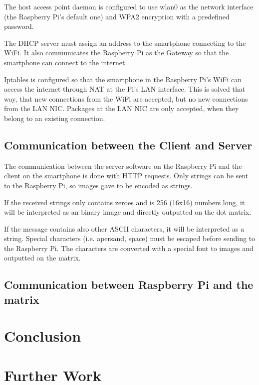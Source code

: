 \documentclass[conference]{IEEEtran}
\begin{document}
The host access point daemon is configured to use wlan0 as the network interface (the Raspberry Pi's default one) and WPA2  encryption with a predefined password.

The DHCP server must assign an address to the smartphone connecting to the WiFi. It also communicates the Raspberry Pi as the Gateway so that the smartphone can connect to the internet.

Iptables is configured so that the smartphone in the Raspberry Pi's WiFi can access the internet through NAT at the Pi's LAN interface. This is solved that way, that new connections from the WiFi are accepted, but no new connections from the LAN NIC. Packages at the LAN NIC are only accepted, when they belong to an existing connection.

\subsection{Communication between the Client and Server}
The communication between the server software on the Raspberry Pi and the client on the smartphone is done with HTTP requests. Only strings can be sent to the Raspberry Pi, so images gave to be encoded as strings.

If the received strings only contains zeroes and is 256 (16x16) numbers long, it will be interpreted as an binary image and directly outputted on the dot matrix.

If the message contains also other ASCII characters, it will be interpreted as a string. Special characters (i.e. apersand, space) must be escaped before sending to the Raspberry Pi. The characters are converted with a special font to images and outputted on the matrix.

\subsection{Communication between Raspberry Pi and the matrix}



\section{Conclusion}



\section{Further Work}
\end{document}
